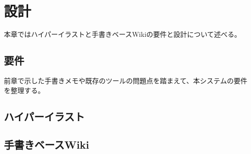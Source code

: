\chapter{設計}
\label{chap:sekkei}

本章ではハイパーイラストと手書きベースWikiの要件と設計について述べる。

\newpage

\section{要件}
前章で示した手書きメモや既存のツールの問題点を踏まえて、本システムの要件を整理する。

\section{ハイパーイラスト}


\section{手書きベースWiki}
